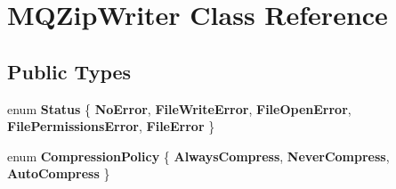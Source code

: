 \hypertarget{class_m_q_zip_writer}{}\section{M\+Q\+Zip\+Writer Class Reference}
\label{class_m_q_zip_writer}
\subsection*{Public Types}
\begin{DoxyCompactItemize}
\item 
\mbox{\label{class_m_q_zip_writer_aca8ef7bd015c0c8d04bba8cd75351ee1}} 
enum {\bfseries Status} \{ \newline
{\bfseries No\+Error}, 
{\bfseries File\+Write\+Error}, 
{\bfseries File\+Open\+Error}, 
{\bfseries File\+Permissions\+Error}, 
\newline
{\bfseries File\+Error}
 \}
\item 
\mbox{\label{class_m_q_zip_writer_a62cb4f05e727c8bbfd1e59c127377675}} 
enum {\bfseries Compression\+Policy} \{ {\bfseries Always\+Compress}, 
{\bfseries Never\+Compress}, 
{\bfseries Auto\+Compress}
 \}
\end{DoxyCompactItemize}
